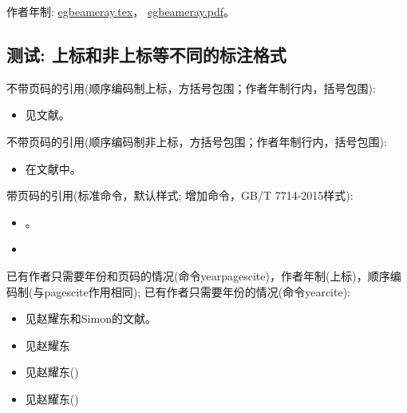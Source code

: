 作者年制:
\href{run:./example/egbeameray.tex}{egbeameray.tex}，
\href{run:./example/egbeameray.pdf}{egbeameray.pdf}。

\subsection{测试: 上标和非上标等不同的标注格式}\label{sec:cite:cmd:test}
\begin{refsection}
不带页码的引用(顺序编码制上标，方括号包围；作者年制行内，括号包围):
\begin{itemize}
  \item 见文献\cite{Peebles2001-100-100}。
\end{itemize}

不带页码的引用(顺序编码制非上标，方括号包围；作者年制行内，括号包围):
\begin{itemize}
  \item 在文献\parencite{Miroslav2004--}中。
\end{itemize}

带页码的引用(标准命令，默认样式; 增加命令，GB/T 7714-2015样式):
\begin{itemize}
  \item \cite[见][49页]{蔡敏2006--}\parencite[见][49页]{Miroslav2004--}。
  \item {}
\end{itemize}

已有作者只需要年份和页码的情况(命令yearpagescite)，作者年制(上标)，顺序编码制(与pagescite作用相同);
已有作者只需要年份的情况(命令yearcite):
\begin{itemize}
  \item 见赵耀东和Simon的文献。
  \item 见赵耀东
  \item 见赵耀东(\cite*{赵耀东1998--})
  \item 见赵耀东(\citeyear{赵耀东1998--})
\end{itemize}

\printbibliography[heading=subbibliography,title=【gb7714-2015顺序编码制上标和非上标标注测试】]
\end{refsection}

